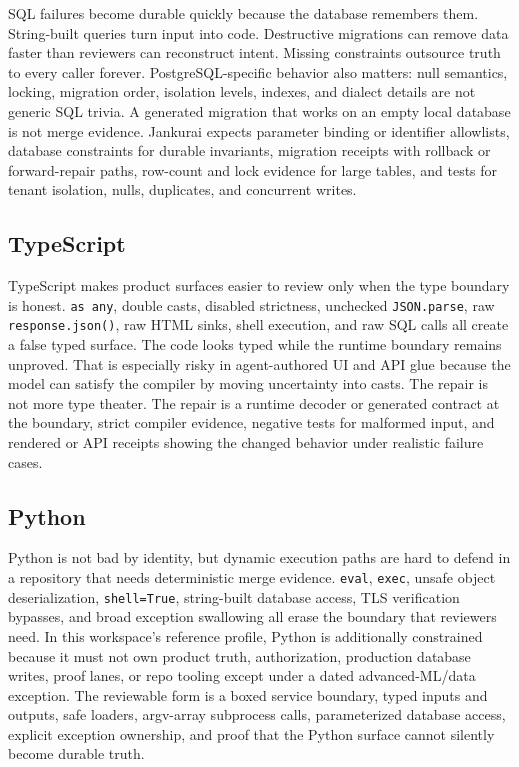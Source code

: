 SQL failures become durable quickly because the database remembers them. String-built queries turn input into code. Destructive migrations can remove data faster than reviewers can reconstruct intent. Missing constraints outsource truth to every caller forever. PostgreSQL-specific behavior also matters: null semantics, locking, migration order, isolation levels, indexes, and dialect details are not generic SQL trivia. A generated migration that works on an empty local database is not merge evidence. Jankurai expects parameter binding or identifier allowlists, database constraints for durable invariants, migration receipts with rollback or forward-repair paths, row-count and lock evidence for large tables, and tests for tenant isolation, nulls, duplicates, and concurrent writes.

\subsection{TypeScript}

TypeScript makes product surfaces easier to review only when the type boundary is honest. \texttt{as any}, double casts, disabled strictness, unchecked \texttt{JSON.parse}, raw \texttt{response.json()}, raw HTML sinks, shell execution, and raw SQL calls all create a false typed surface. The code looks typed while the runtime boundary remains unproved. That is especially risky in agent-authored UI and API glue because the model can satisfy the compiler by moving uncertainty into casts. The repair is not more type theater. The repair is a runtime decoder or generated contract at the boundary, strict compiler evidence, negative tests for malformed input, and rendered or API receipts showing the changed behavior under realistic failure cases.

\subsection{Python}

Python is not bad by identity, but dynamic execution paths are hard to defend in a repository that needs deterministic merge evidence. \texttt{eval}, \texttt{exec}, unsafe object deserialization, \texttt{shell=True}, string-built database access, TLS verification bypasses, and broad exception swallowing all erase the boundary that reviewers need. In this workspace's reference profile, Python is additionally constrained because it must not own product truth, authorization, production database writes, proof lanes, or repo tooling except under a dated advanced-ML/data exception. The reviewable form is a boxed service boundary, typed inputs and outputs, safe loaders, argv-array subprocess calls, parameterized database access, explicit exception ownership, and proof that the Python surface cannot silently become durable truth.

